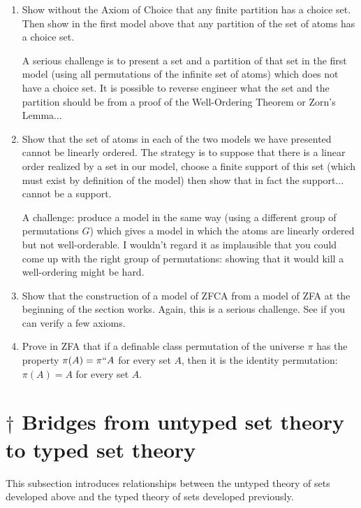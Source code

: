 \documentclass[12pt]{book}
\begin{document}
\begin{enumerate}

\item  Show without the Axiom of Choice that any finite partition has a choice set.  Then show in the first model above that any partition of the set of atoms has a choice set.

A serious challenge is to present a set and a partition of that set in the first model (using all permutations of the infinite set of atoms) which does not have a choice set.  It is possible to reverse engineer what the set and the partition should be from a proof of the Well-Ordering Theorem or Zorn's Lemma$\ldots$

\item  Show that the set of atoms in each of the two models we have presented cannot be linearly ordered.  The strategy is to suppose that there is a linear order realized by a set in our model, choose a finite support of this set (which must exist by definition of the model) then show that in fact the support$\ldots$cannot be a support.

A challenge:  produce a model in the same way (using a different group of permutations $G$) which gives a model in which the atoms are linearly ordered but not well-orderable.
I wouldn't regard it as implausible that you could come up with the right group of permutations:  showing that it would kill a well-ordering might be hard.

\item Show that the construction of a model of ZFCA from a model of ZFA at the beginning of the section works.  Again, this is a serious challenge.   See if you can verify a few axioms.

\item Prove in ZFA that if a definable class permutation of the universe $\pi$ has the property $\pi(A) = \pi``A$ for every set $A$, then it is the identity permutation:  $\pi(A) = A$ for every set $A$.

\end{enumerate}

\newpage

\section{$\dagger$ Bridges from untyped set theory to typed set theory}

This subsection introduces relationships between the untyped theory of sets developed above and the typed theory of sets developed previously.
\end{document}

